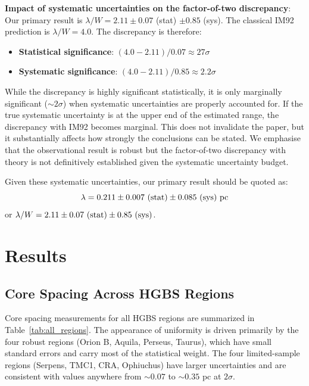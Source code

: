\documentclass[11pt,a4paper]{article}
\begin{document}
\textbf{Impact of systematic uncertainties on the factor-of-two discrepancy}: Our primary result is $\lambda/W = 2.11 \pm 0.07$ (stat) $\pm 0.85$ (sys). The classical IM92 prediction is $\lambda/W = 4.0$. The discrepancy is therefore:
\begin{itemize}
    \item \textbf{Statistical significance}: $(4.0 - 2.11) / 0.07 \approx 27\sigma$
    \item \textbf{Systematic significance}: $(4.0 - 2.11) / 0.85 \approx 2.2\sigma$
\end{itemize}
While the discrepancy is highly significant statistically, it is only marginally significant ($\sim2\sigma$) when systematic uncertainties are properly accounted for. If the true systematic uncertainty is at the upper end of the estimated range, the discrepancy with IM92 becomes marginal. This does not invalidate the paper, but it substantially affects how strongly the conclusions can be stated. We emphasise that the observational result is robust but the factor-of-two discrepancy with theory is not definitively established given the systematic uncertainty budget.

Given these systematic uncertainties, our primary result should be quoted as:
\begin{equation}
\lambda = 0.211 \pm 0.007~({\rm stat}) \pm 0.085~({\rm sys})~{\rm pc}
\end{equation}
or $\lambda/W = 2.11 \pm 0.07~({\rm stat}) \pm 0.85~({\rm sys})$.

\section{Results}
\label{sec:results}

\subsection{Core Spacing Across HGBS Regions}

Core spacing measurements for all HGBS regions are summarized in Table~\ref{tab:all_regions}. The appearance of uniformity is driven primarily by the four robust regions (Orion B, Aquila, Perseus, Taurus), which have small standard errors and carry most of the statistical weight. The four limited-sample regions (Serpens, TMC1, CRA, Ophiuchus) have larger uncertainties and are consistent with values anywhere from $\sim0.07$ to $\sim0.35$ pc at $2\sigma$.
\end{document}
